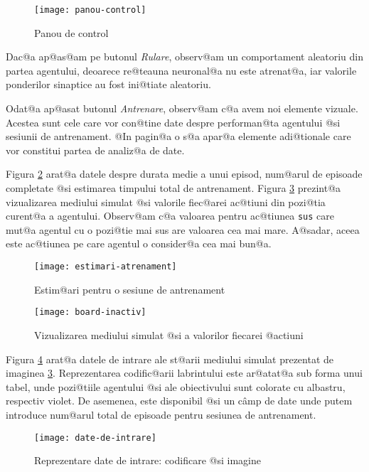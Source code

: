 \begin{figure}[h]
	\centering
	\texttt{[image: panou-control]}
	\caption{Panou de control}
	\label{fig:panou-control}
\end{figure}

Dac@a ap@as@am pe butonul \textsl{Rulare}, observ@am un comportament aleatoriu din partea agentului, deoarece re@teauna neuronal@a nu este atrenat@a, iar valorile ponderilor sinaptice au fost ini@tiate aleatoriu.

Odat@a ap@asat butonul \textsl{Antrenare}, observ@am c@a avem noi elemente vizuale. Acestea sunt cele care vor con@tine date despre performan@ta agentului @si sesiunii de antrenament. @In pagin@a o s@a apar@a elemente adi@tionale care vor constitui partea de  analiz@a de date. 

Figura \ref{fig:estimari-antrenament} arat@a datele despre durata medie a unui episod, num@arul de episoade completate @si estimarea timpului total de antrenament. Figura \ref{fig:board-inactiv} prezint@a vizualizarea mediului simulat @si valorile fiec@arei ac@tiuni din pozi@tia curent@a a agentului. Observ@am c@a valoarea pentru ac@tiunea \texttt{sus} care mut@a agentul cu o pozi@tie mai sus are valoarea cea mai mare. A@sadar, aceea este ac@tiunea pe care agentul o consider@a cea mai bun@a. 

\begin{figure}[h]
	\centering
	\texttt{[image: estimari-atrenament]}
	\caption{Estim@ari pentru o sesiune de antrenament}
	\label{fig:estimari-antrenament}
\end{figure}

\begin{figure}[h]
	\centering
	\texttt{[image: board-inactiv]}
	\caption{Vizualizarea mediului simulat @si a valorilor fiecarei @actiuni}
	\label{fig:board-inactiv}
\end{figure}

Figura \ref{fig:date-de-intrare} arat@a datele de intrare ale st@arii mediului simulat prezentat de imaginea \ref{fig:board-inactiv}. Reprezentarea codific@arii labrintului este ar@atat@a sub forma unui tabel, unde pozi@tiile agentului @si ale obiectivului sunt colorate cu albastru, respectiv violet. De asemenea, este disponibil @si un c\^ amp de date unde putem introduce num@arul total de episoade pentru sesiunea de antrenament.

\begin{figure}[h]
	\centering
	\texttt{[image: date-de-intrare]}
	\caption{Reprezentare date de intrare: codificare @si imagine}
	\label{fig:date-de-intrare}
\end{figure}

